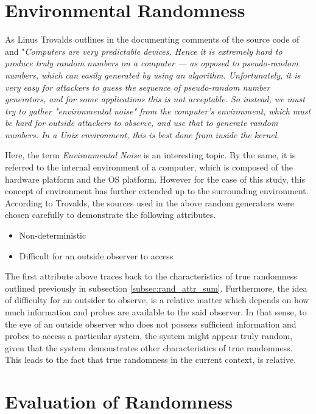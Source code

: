 \section{Environmental Randomness}

As Linus Trovalds outlines in the documenting comments of the source code of  and  "\textit{Computers are very predictable devices.  Hence it is extremely hard to produce truly random numbers on a computer --- as opposed to pseudo-random numbers, which can easily generated by using an algorithm. Unfortunately, it is very easy for attackers to guess the sequence of pseudo-random number generators, and for some applications this is not acceptable.  So instead, we must try to gather "environmental noise" from the computer's environment, which must be hard for outside attackers to observe, and use that to generate random numbers.  In a Unix environment, this is best done from inside the kernel.}\cite{web_random_c_git}

Here, the term \textit{Environmental Noise} is an interesting topic. By the same, it is referred to the internal environment of a computer, which is composed of the hardware platform and the OS platform. However for the case of this study, this concept of environment has further extended up to the surrounding environment. According to Trovalds, the sources used in the above random generators were chosen carefully to demonstrate the following attributes.

\begin{itemize}
    \item Non-deterministic
    \item Difficult for an outside observer to access
\end{itemize}

The first attribute above traces back to the characteristics of true randomness outlined previously in subsection \ref{subsec:rand_attr_sum}. Furthermore, the idea of difficulty for an outsider to observe, is a relative matter which depends on how much information and probes are available to the said observer. In that sense, to the eye of an outside observer who does not possess sufficient information and probes to access a particular system, the system might appear truly random, given that the system demonstrates other characteristics of true randomness. This leads to the fact that true randomness in the current context, is relative.

\section{Evaluation of Randomness}

